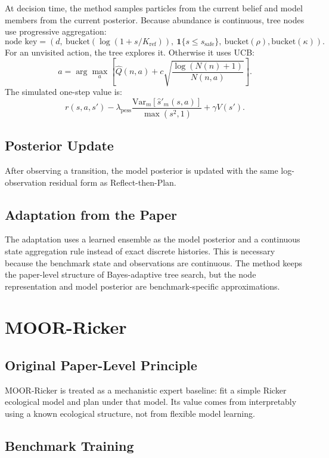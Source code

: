\documentclass[11pt]{article}
\newcommand{\Var}{\mathrm{Var}}
\newcommand{\1}{\mathbf{1}}
\begin{document}
At decision time, the method samples particles from the current belief and model
members from the current posterior.  Because abundance is continuous, tree nodes
use progressive aggregation:
\[
  \text{node key} =
  (d,\ \mathrm{bucket}(\log(1+s/K_{\mathrm{ref}})),\
   \1\{s\le s_{\mathrm{safe}}\},\
   \mathrm{bucket}(\rho),\mathrm{bucket}(\kappa)).
\]
For an unvisited action, the tree explores it.  Otherwise it uses UCB:
\[
  a=\arg\max_a
  \left[
    \hat{Q}(n,a)+c\sqrt{\frac{\log(N(n)+1)}{N(n,a)}}
  \right].
\]
The simulated one-step value is:
\[
  r(s,a,s')-\lambda_{\mathrm{pess}}
  \frac{\Var_m[\hat{s}'_m(s,a)]}{\max(s^2,1)}
  +\gamma V(s').
\]

\subsection{Posterior Update}

After observing a transition, the model posterior is updated with the same
log-observation residual form as Reflect-then-Plan.

\subsection{Adaptation from the Paper}

The adaptation uses a learned ensemble as the model posterior and a continuous
state aggregation rule instead of exact discrete histories.  This is necessary
because the benchmark state and observations are continuous.  The method keeps
the paper-level structure of Bayes-adaptive tree search, but the node
representation and model posterior are benchmark-specific approximations.

\section{MOOR-Ricker}

\subsection{Original Paper-Level Principle}

MOOR-Ricker is treated as a mechanistic expert baseline: fit a simple Ricker
ecological model and plan under that model.  Its value comes from interpretably
using a known ecological structure, not from flexible model learning.

\subsection{Benchmark Training}
\end{document}
